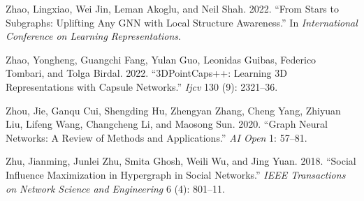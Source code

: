 \documentclass[
  12pt,
]{krantz}
\newlength{\cslhangindent}
\newenvironment{CSLReferences}[2] %
 {\begin{list}{}{%
  \setlength{\itemindent}{0pt}
  \setlength{\leftmargin}{0pt}
  \setlength{\parsep}{0pt}
  \ifodd #1
   \setlength{\leftmargin}{\cslhangindent}
   \setlength{\itemindent}{-1\cslhangindent}
  \fi
  \setlength{\itemsep}{#2\baselineskip}}}
 {\end{list}}
\begin{document}
\begin{CSLReferences}{1}{0}
Zhao, Lingxiao, Wei Jin, Leman Akoglu, and Neil Shah. 2022. {``From
Stars to Subgraphs: Uplifting Any {GNN} with Local Structure
Awareness.''} In \emph{International Conference on Learning
Representations}.

Zhao, Yongheng, Guangchi Fang, Yulan Guo, Leonidas Guibas, Federico
Tombari, and Tolga Birdal. 2022. {``3{DP}oint{C}aps++: Learning 3{D}
Representations with Capsule Networks.''} \emph{Ijcv} 130 (9): 2321--36.

Zhou, Jie, Ganqu Cui, Shengding Hu, Zhengyan Zhang, Cheng Yang, Zhiyuan
Liu, Lifeng Wang, Changcheng Li, and Maosong Sun. 2020. {``Graph Neural
Networks: A Review of Methods and Applications.''} \emph{AI Open} 1:
57--81.

Zhu, Jianming, Junlei Zhu, Smita Ghosh, Weili Wu, and Jing Yuan. 2018.
{``Social Influence Maximization in Hypergraph in Social Networks.''}
\emph{IEEE Transactions on Network Science and Engineering} 6 (4):
801--11.

\end{CSLReferences}
\end{document}
